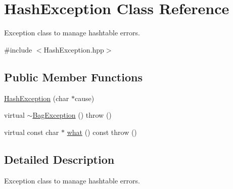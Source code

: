 \hypertarget{class_hash_exception}{\section{\-Hash\-Exception \-Class \-Reference}
\label{class_hash_exception}
}


\-Exception class to manage hashtable errors.  




{\ttfamily \#include $<$\-Hash\-Exception.\-hpp$>$}

\subsection*{\-Public \-Member \-Functions}
\begin{DoxyCompactItemize}
\item 
\hyperlink{class_hash_exception_a0ab1147731b1598569ec51f028870cda}{\-Hash\-Exception} (char $\ast$cause)
\item 
virtual \hyperlink{class_hash_exception_a12cbec987f6181a57633a0d78de45326}{$\sim$\-Bag\-Exception} ()  throw ()
\item 
virtual const char $\ast$ \hyperlink{class_hash_exception_a542711eb0045dcec64d7a8596b2450ff}{what} () const   throw ()
\end{DoxyCompactItemize}


\subsection{\-Detailed \-Description}
\-Exception class to manage hashtable errors. 

